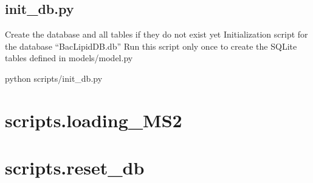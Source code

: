 \documentclass[letterpaper,10pt,english]{sphinxmanual}
\begin{document}
\subsection{init\_db.py}
\label{\detokenize{api:init-db-py}}
\sphinxAtStartPar
Create the database and all tables if they do not exist yet
Initialization script for the database “BacLipidDB.db”
Run this script only once to create the SQLite tables defined in models/model.py
\begin{description}
\sphinxAtStartPar
python scripts/init\_db.py

\end{description}

\begin{fulllineitems}
\label{\detokenize{api:scripts.init_db.main}}
\pysigstartsignatures
\pysiglinewithargsret
{}
{}
{}
\pysigstopsignatures
\end{fulllineitems}



\section{scripts.loading\_MS2}
\label{\detokenize{api:scripts-loading-ms2}}

\section{scripts.reset\_db}
\label{\detokenize{api:module-scripts.reset_db}}\label{\detokenize{api:scripts-reset-db}}
\end{document}
